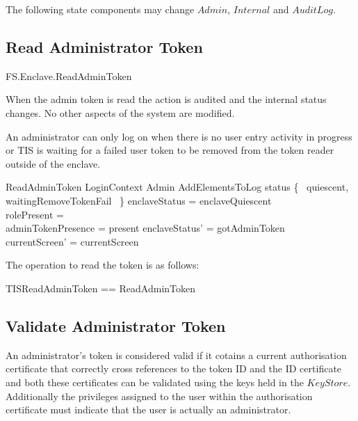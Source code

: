\begin{Zcomment}
\item
The following state components may change
$Admin$, $Internal$ and $AuditLog$. 
\end{Zcomment}

\subsection{Read Administrator Token}

\begin{traceunit}{FS.Enclave.ReadAdminToken}
\end{traceunit}

When the admin token is read the action is audited and the internal
status changes. No other aspects of the system are modified.

An administrator can only log on when there is no user entry activity
in progress or TIS is waiting for a failed user token to be removed
from the token reader outside of the enclave.

\begin{schema}{ReadAdminToken}
         LoginContext
\also
        \Xi Admin
\also
        AddElementsToLog
\where
        status \in \{~ quiescent, waitingRemoveTokenFail ~\}
\also
        enclaveStatus = enclaveQuiescent
\\      rolePresent = \Nil
\\	adminTokenPresence = present
\also
	enclaveStatus' = gotAdminToken
\\      currentScreen' = currentScreen
\end{schema}

The operation to read the token is as follows:

\begin{zed}
        TISReadAdminToken == 
                ReadAdminToken   
\end{zed}

\subsection{Validate Administrator Token}

An administrator's token is considered valid if it cotains a current
authorisation certificate that correctly cross references to the token
ID and the ID certificate and both these certificates can be validated
using the keys held in the $KeyStore$. Additionally the
privileges assigned to the user within the authorisation certificate
must indicate that the user is actually an administrator.

